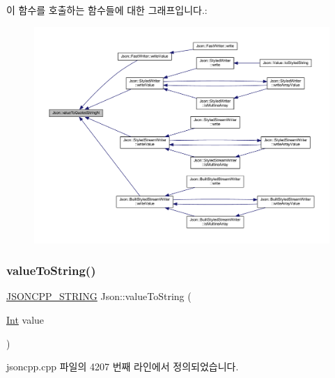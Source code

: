 이 함수를 호출하는 함수들에 대한 그래프입니다.\+:\nopagebreak
\begin{figure}[H]
\begin{center}
\leavevmode
\includegraphics[width=350pt]{namespace_json_a29aff81733b8fdaabf3f1acfc3ad339f_icgraph}
\end{center}
\end{figure}
\mbox{\label{namespace_json_a498503e8f49d6a3811e3c9f6757da60d}} 
\subsubsection{\texorpdfstring{value\+To\+String()}{valueToString()}\hspace{0.1cm}{\footnotesize\ttfamily [1/6]}}
{\footnotesize\ttfamily \hyperlink{json_8h_a1e723f95759de062585bc4a8fd3fa4be}{J\+S\+O\+N\+C\+P\+P\+\_\+\+S\+T\+R\+I\+NG} Json\+::value\+To\+String (\begin{DoxyParamCaption}\item[{\hyperlink{namespace_json_a08122e8005b706d982e48cca1e2119c7}{Int}}]{value }\end{DoxyParamCaption})}



jsoncpp.\+cpp 파일의 4207 번째 라인에서 정의되었습니다.



